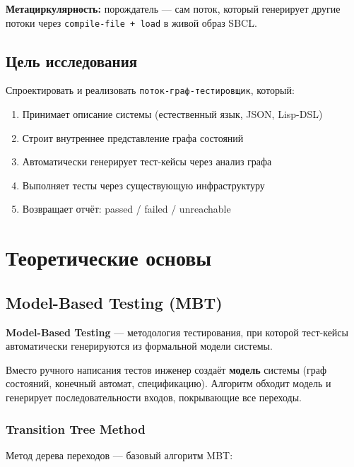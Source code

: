 \documentclass[12pt, a4paper, twoside]{article}
\begin{document}
\textbf{Метациркулярность:} порождатель --- сам поток, который генерирует
другие потоки через \texttt{compile-file + load} в живой образ SBCL.

\subsection{Цель исследования}

Спроектировать и реализовать \texttt{поток-граф-тестировщик}, который:

\begin{enumerate}[leftmargin=1.5em]
  \item Принимает описание системы (естественный язык, JSON, Lisp-DSL)
  \item Строит внутреннее представление графа состояний
  \item Автоматически генерирует тест-кейсы через анализ графа
  \item Выполняет тесты через существующую инфраструктуру
  \item Возвращает отчёт: passed / failed / unreachable
\end{enumerate}

\section{Теоретические основы}

\subsection{Model-Based Testing (MBT)}

\textbf{Model-Based Testing} --- методология тестирования, при которой
тест-кейсы автоматически генерируются из формальной модели системы.

\begin{infobox}[title={Ключевая идея MBT}]
Вместо ручного написания тестов инженер создаёт \textbf{модель} системы
(граф состояний, конечный автомат, спецификацию). Алгоритм обходит модель
и генерирует последовательности входов, покрывающие все переходы.
\end{infobox}

\subsubsection{Transition Tree Method}

Метод дерева переходов --- базовый алгоритм MBT:
\end{document}
